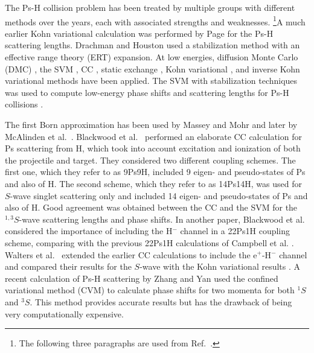\documentclass[Dissertation.tex]{subfiles}
\begin{document}
The Ps-H collision problem has been treated by multiple groups with different
methods over the years, each with associated strengths and weaknesses.
\footnote{The following three paragraphs are used from Ref.~\cite{Woods2015}.}A much 
earlier Kohn variational calculation was performed by Page \cite{Page1976} 
for the Ps-H scattering lengths. Drachman and Houston
\cite{Drachman1975,Drachman1976} used
a stabilization method with an effective range theory (ERT) expansion.
At low energies, diffusion Monte Carlo (DMC)
\cite{Chiesa2002}, the SVM \cite{Ivanov2001,Ivanov2002}, CC
\cite{Sinha1997,Campbell1998,Adhikari1999,Sinha2000,Blackwood2002,Blackwood2002b,Walters2004},
static exchange \cite{Hara1975,Ray1997,*Ray1996}, Kohn variational
\cite{Page1976,VanReeth2003,VanReeth2004}, and inverse Kohn
variational \cite{VanReeth2003,VanReeth2004} methods have been applied. The SVM
with stabilization 
techniques was used to compute low-energy phase shifts and 
scattering lengths for Ps-H collisions \cite{Ivanov2001,Ivanov2002}.

The first Born approximation has been used by Massey and Mohr \cite{Massey1954}
and later by McAlinden et al.~\cite{McAlinden1996}.
Blackwood et al.~\cite{Blackwood2002} performed an elaborate CC calculation 
for Ps scattering from H, which took into account excitation and ionization 
of both the projectile and target. They considered two different coupling 
schemes. The first one, which they refer to as 9Ps9H, included 9 eigen- and 
pseudo-states of Ps and also of H. The second scheme, which they refer to as 
14Ps14H, was used for $S$-wave singlet scattering only and included
14 eigen- and pseudo-states of 
Ps and also of H. Good agreement was obtained between the CC
\cite{Blackwood2002} and the SVM \cite{Ivanov2002} for the $^{1,3}S$-wave scattering
lengths and phase shifts. In another paper, Blackwood et
al.~\cite{Blackwood2002b} considered the importance of including the H$^-$
channel in a 22Ps1H coupling scheme, comparing with the previous 22Ps1H
calculations of Campbell et al. \cite{Campbell1998}. Walters et
al.~\cite{Walters2004} extended the earlier CC calculations
\cite{Blackwood2002} to include the e$^+$-H$^-$ channel
\cite{Blackwood2002b} and compared their results for the $S$-wave with the
Kohn variational results \cite{VanReeth2003}.
A recent calculation of Ps-H scattering by Zhang and Yan
\cite{Zhang2012} used the
confined variational method (CVM) to calculate phase shifts for two momenta
for both $^1S$ and $^3S$. This method provides accurate
results but has the drawback of being very computationally expensive.
\end{document}
